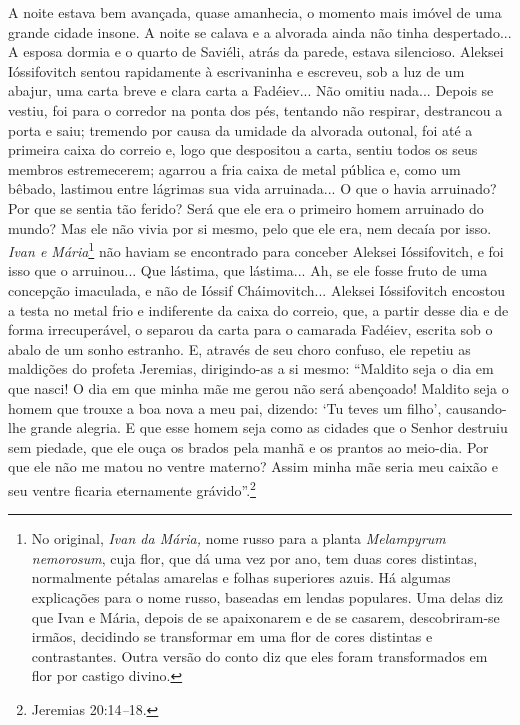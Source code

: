 A noite estava bem avançada, quase amanhecia, o momento mais imóvel de
uma grande cidade insone. A noite se calava e a alvorada ainda não tinha
despertado... A esposa dormia e o quarto de Saviéli, atrás da parede,
estava silencioso. Aleksei Ióssifovitch sentou rapidamente à
escrivaninha e escreveu, sob a luz de um abajur, uma carta breve e clara
carta a Fadéiev... Não omitiu nada... Depois se vestiu, foi para o
corredor na ponta dos pés, tentando não respirar, destrancou a porta e
saiu; tremendo por causa da umidade da alvorada outonal, foi até a
primeira caixa do correio e, logo que despositou a carta, sentiu todos
os seus membros estremecerem; agarrou a fria caixa de metal pública e,
como um bêbado, lastimou entre lágrimas sua vida arruinada... O que o
havia arruinado? Por que se sentia tão ferido? Será que ele era o
primeiro homem arruinado do mundo? Mas ele não vivia por si mesmo, pelo
que ele era, nem decaía por isso. \emph{Ivan e Mária}\footnote{No
  original, \emph{Ivan da Mária,} nome russo para a planta
  \emph{Melampyrum nemorosum}, cuja flor, que dá uma vez por ano, tem
  duas cores distintas, normalmente pétalas amarelas e folhas superiores
  azuis. Há algumas explicações para o nome russo, baseadas em lendas
  populares. Uma delas diz que Ivan e Mária, depois de se apaixonarem e
  de se casarem, descobriram-se irmãos, decidindo se transformar em uma
  flor de cores distintas e contrastantes. Outra versão do conto diz que
  eles foram transformados em flor por castigo divino.} não haviam se
encontrado para conceber Aleksei Ióssifovitch, e foi isso que o
arruinou... Que lástima, que lástima... Ah, se ele fosse fruto de uma
concepção imaculada, e não de Ióssif Cháimovitch... Aleksei Ióssifovitch
encostou a testa no metal frio e indiferente da caixa do correio, que, a
partir desse dia e de forma irrecuperável, o separou da carta para o
camarada Fadéiev, escrita sob o abalo de um sonho estranho. E, através
de seu choro confuso, ele repetiu as maldições do profeta Jeremias,
dirigindo-as a si mesmo: ``Maldito seja o dia em que nasci! O dia em que
minha mãe me gerou não será abençoado! Maldito seja o homem que trouxe a
boa nova a meu pai, dizendo: `Tu teves um filho', causando-lhe grande
alegria. E que esse homem seja como as cidades que o Senhor destruiu sem
piedade, que ele ouça os brados pela manhã e os prantos ao meio-dia. Por
que ele não me matou no ventre materno? Assim minha mãe seria meu caixão
e seu ventre ficaria eternamente grávido''.\footnote{Jeremias
  20:14\emph{--}18.}

